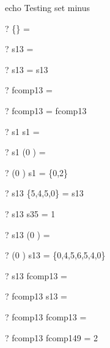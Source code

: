 echo     Testing set minus
\begin{zed} \vdash?  \{\}      \setminus \emptyset   = \emptyset \end{zed}
\begin{zed} \vdash?  \emptyset \setminus s13         = \emptyset \end{zed}
\begin{zed} \vdash?  s13       \setminus \emptyset   = s13 \end{zed}
\begin{zed} \vdash?  \emptyset \setminus fcomp13     = \emptyset \end{zed}
\begin{zed} \vdash?  fcomp13   \setminus \emptyset   = fcomp13 \end{zed}
\begin{zed} \vdash?  s1        \setminus s1          = \emptyset \end{zed}
\begin{zed} \vdash?  s1        \setminus (0 ) = \emptyset \end{zed}
\begin{zed} \vdash?  (0 ) \setminus s1        = \{0,2\} \end{zed}
\begin{zed} \vdash?  s13       \setminus \{5,4,5,0\} = s13 \end{zed}
\begin{zed} \vdash?  s13       \setminus s35         = 1  \end{zed}
\begin{zed} \vdash?  s13       \setminus (0 ) = \emptyset \end{zed}
\begin{zed} \vdash?  (0 ) \setminus s13       = \{0,4,5,6,5,4,0\} \end{zed}
\begin{zed} \vdash?  s13       \setminus fcomp13     = \emptyset \end{zed}
\begin{zed} \vdash?  fcomp13   \setminus s13         = \emptyset \end{zed}
\begin{zed} \vdash?  fcomp13   \setminus fcomp13     = \emptyset \end{zed}
\begin{zed} \vdash?  fcomp13   \setminus fcomp149    = 2  \end{zed}


